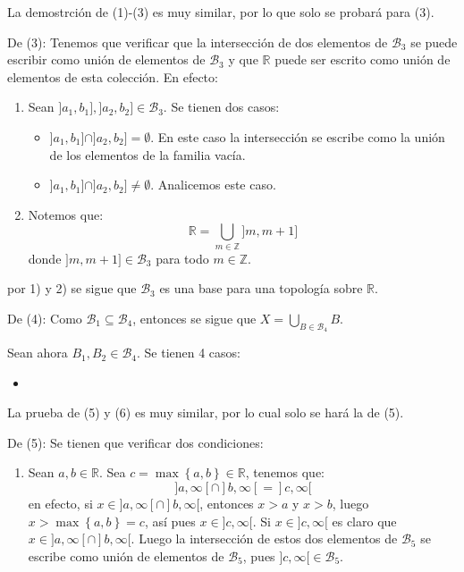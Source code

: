 \documentclass[12pt]{report}
\theoremstyle{largebreak}
\begin{document}
    \begin{sol}
        La demostrción de (1)-(3) es muy similar, por lo que solo se probará para (3).
        
        De (3): Tenemos que verificar que la intersección de dos elementos de $\mathcal{B}_3$ se puede escribir como unión de elementos de $\mathcal{B}_3$ y que $\mathbb{R}$ puede ser escrito como unión de elementos de esta colección. En efecto:
        \begin{enumerate}
            \item Sean $]a_1,b_1],]a_2,b_2]\in\mathcal{B}_3$. Se tienen dos casos:
            \begin{itemize}
                \item $]a_1,b_1]\cap]a_2,b_2]=\emptyset$. En este caso la intersección se escribe como la unión de los elementos de la familia vacía.
                \item $]a_1,b_1]\cap]a_2,b_2]\neq \emptyset$. Analicemos este caso.
            \end{itemize}
            \item Notemos que:
            \begin{equation*}
                \mathbb{R}=\bigcup_{m\in\mathbb{Z} }]m,m+1]
            \end{equation*}
            donde $]m,m+1]\in\mathcal{B}_3$ para todo $m\in\mathbb{Z}$.
        \end{enumerate}
        por 1) y 2) se sigue que $\mathcal{B}_3$ es una base para una topología sobre $\mathbb{R}$.


        De (4): Como $\mathcal{B}_1\subseteq\mathcal{B}_4$, entonces se sigue que $X=\bigcup_{B\in\mathcal{B}_4}B$.

        Sean ahora $B_1,B_2\in\mathcal{B}_4$. Se tienen 4 casos:
        \begin{itemize}
            \item 
        \end{itemize}

        La prueba de (5) y (6) es muy similar, por lo cual solo se hará la de (5).
        
        De (5): Se tienen que verificar dos condiciones:
        \begin{enumerate}
            \item Sean $a,b\in\mathbb{R}$. Sea $c=\max\left\{a,b\right\}\in\mathbb{R}$, tenemos que:
            \begin{equation*}
                ]a,\infty[\cap]b,\infty[=]c,\infty[
            \end{equation*}
            en efecto, si $x\in ]a,\infty[\cap]b,\infty[$, entonces $x>a$ y $x>b$, luego $x>\max\left\{a,b\right\}=c$, así pues $x\in ]c,\infty[$. Si $x\in]c,\infty[$ es claro que $x\in]a,\infty[\cap]b,\infty[$. Luego la intersección de estos dos elementos de $\mathcal{B}_5$ se escribe como unión de elementos de $\mathcal{B}_5$, pues $]c,\infty[\in\mathcal{B}_5$.


\end{enumerate}
\end{sol}
\end{document}
